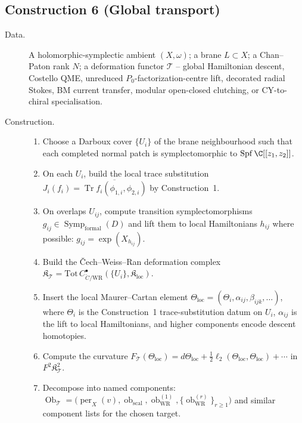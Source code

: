 \subsection*{Construction 6 (Global transport)}\label{algo:global-transport}

\begin{description}
\item[Data.]  A holomorphic-symplectic ambient \((X,\omega)\); a
brane \(L\subset X\); a Chan--Paton rank \(N\); a deformation
functor \(\mathcal T\) -- global Hamiltonian descent, Costello QME,
unreduced \(P_0\)-factorization-centre lift, decorated radial Stokes,
BM current transfer, modular open-closed clutching, or CY-to-chiral
specialisation.
\item[Construction.]
\begin{enumerate}
\item Choose a Darboux cover \(\{U_i\}\) of the brane neighbourhood
such that each completed normal patch is symplectomorphic to
\(\mathrm{Spf}\,\C[[z_1,z_2]]\).
\item On each \(U_i\), build the local trace substitution
\(J_i(f_i)=\overline{\operatorname{Tr}f_i(\phi_{1,i},\phi_{2,i})}\)
by Construction~1.
\item On overlaps \(U_{ij}\), compute transition symplectomorphisms
\(g_{ij}\in\operatorname{Symp}_{\mathrm{formal}}(D)\) and lift them
to local Hamiltonians \(h_{ij}\) where possible:
\(g_{ij}=\exp(X_{h_{ij}})\).
\item Build the \v{C}ech--Weiss--Ran deformation complex
\(\mathfrak K_{\mathcal T}=
\mathrm{Tot}\,C^\bullet_{\check C/\mathrm{WR}}(\{U_i\},\mathfrak K_{\mathrm{loc}})\).
\item Insert the local Maurer--Cartan element
\(\Theta_{\mathrm{loc}}=(\Theta_i,\alpha_{ij},\beta_{ijk},\dots)\),
where \(\Theta_i\) is the Construction~1 trace-substitution datum on
\(U_i\), \(\alpha_{ij}\) is the lift to local Hamiltonians, and
higher components encode descent homotopies.
\item Compute the curvature
\(F_{\mathcal T}(\Theta_{\mathrm{loc}})=d\Theta_{\mathrm{loc}}+
\tfrac12\ell_2(\Theta_{\mathrm{loc}},\Theta_{\mathrm{loc}})+\cdots\)
in \(F^2\mathfrak K^2_{\mathcal T}\).
\item Decompose into named components:
\(\operatorname{Ob}_{\mathcal T}=\bigl(\operatorname{per}_X(v),\operatorname{ob}_{\mathrm{scal}},
\operatorname{ob}_{\mathrm{WR}}^{(1)},\bigl\{\operatorname{ob}_{\mathrm{WR}}^{(r)}\bigr\}_{r\ge 1}\bigr)\)
and similar component lists for the chosen target.

\end{enumerate}
\end{description}
